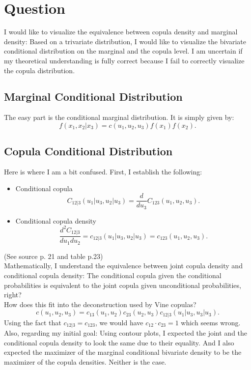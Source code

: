 \documentclass[11pt,a4paper,onecolumn,oneside]{article}
\begin{document}
\section{Question}%
\label{sec:Question}
I would like to visualize the equivalence between copula density and marginal density:
Based on a trivariate distribution, I would like to visualize the bivariate conditional distribution on the marginal and the copula level. I am uncertain if my theoretical understanding is fully correct because I fail to correctly visualize the copula distribution.

\subsection{Marginal Conditional Distribution}
\label{subsec:Marginal Distribution}
The easy part is the conditional marginal distribution. It is simply given by:
\[
	f(x_1, x_2 |x_3) = c(u_1, u_2, u_3) f(x_1) f(x_2)
.\] 

\subsection{Copula Conditional Distribution}
\label{subsec:Copula Conditional Distribution}
Here is where I am a bit confused. First, I establish the following:
\begin{itemize}
	\item Conditional copula\[
			C_{12|3}(u_1|u_3, u_2|u_3) = \frac{d}{du_3}C_{123}(u_1, u_2, u_3)
	.\] 
	\item Conditional copula density \[
			\frac{d^2C_{12|3}}{du_1 du_2} = c_{12|3}(u_1|u_3, u_2|u_3) = c_{123}(u_1, u_2, u_3)
	.\] 
\end{itemize}
(See source p. 21 and table p.23)\\
Mathematically, I understand the equivalence between joint copula density and conditional copula density: The conditional copula given the conditional probabilities is equivalent to the joint copula given unconditional probabilities, right?\\

How does this fit into the deconstruction used by Vine copulas? 
\[
	c(u_1, u_2, u_3) = c_{13}(u_1, u_2) c_{23}(u_2, u_3) c_{12|3}(u_1|u_3, u_3|u_3)
.\] 
Using the fact that $c_{12|3} = c_{123}$, we would have $c_{12} \cdot c_{23} = 1$ which seems wrong. \\
Also, regarding my initial goal: 
Using contour plots, I expected the joint and the conditional copula density to look the same due to their equality. And I also expected the maximizer of the marginal conditional bivariate density to be the maximizer of the copula densities. Neither is the case. 
\end{document}

